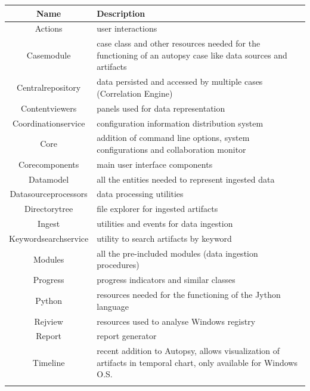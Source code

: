 \begin{tabularx}{\textwidth}{@{}|c| *1{>{\centering\arraybackslash}X}@{}|}
    \hline
    \textbf{Name} & \textbf{Description} \\
    \hline\hline
    Actions & user interactions  \\
    \hline
    Casemodule & case class and other resources needed for the functioning of an autopsy case like data sources and artifacts \\
    \hline
    Centralrepository & data persisted and accessed by multiple cases (Correlation Engine) \\
    \hline
    Contentviewers & panels used for data representation  \\
    \hline
    Coordinationservice & configuration information distribution system \\
    \hline
    Core & addition of command line options, system configurations and collaboration monitor  \\
    \hline
    Corecomponents & main user interface components \\
    \hline
    Datamodel & all the entities needed to represent ingested data \\
    \hline
    Datasourceprocessors & data processing utilities  \\
    \hline
    Directorytree & file explorer for ingested artifacts \\
    \hline
    Ingest & utilities and events for data ingestion  \\
    \hline
    Keywordsearchservice & utility to search artifacts by keyword  \\
    \hline
    Modules & all the pre-included modules (data ingestion procedures) \\
    \hline
    Progress & progress indicators and similar classes \\
    \hline
    Python & resources needed for the functioning of the Jython language \\
    \hline
    Rejview & resources used to analyse Windows registry \\
    \hline
    Report & report generator \\
    \hline
    Timeline & recent addition to Autopsy, allows visualization of artifacts in temporal chart, only available for Windows O.S. \\
    \hline
    \caption{Autopsy Modules Overview}
    \label{tab:autopsyOverview}
\end{tabularx}


